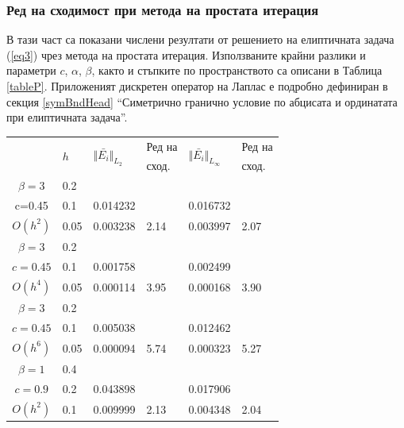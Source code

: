 \documentclass[a4paper]{article}
\newcommand{\rf}[1]{(\ref{#1})}
\theoremstyle{remark}
\begin{document}
\begin{large}
\subsubsection{Ред на сходимост при метода на простата итерация}\label{validation}
В тази част са показани числени резултати от решението на елиптичната задача \rf{eq3} чрез метода на простата итерация. Използваните крайни разлики и параметри $c$, $\alpha$, $\beta$, както и стъпките по пространството са описани в Таблица \ref{tableP}. Приложеният дискретен оператор на Лаплас е подробно дефиниран в секция \ref{symBndHead} ``Симетрично гранично условие по абцисата и ординатата при елиптичната задача''.

\begin{table}[ht]
\centering
		\begin{tabular}{||c|l|ll|ll||}
			\hline
			\hline
      \multirow{2  }{*}{ }        & \multirow{2  }{*}{$h$}  &  	\multirow{2  }{*}{ $\Vert \bar{ E_i} \Vert_{L_2}$ }	&Ред на	& \multirow{2  }{*}{ $\Vert \bar{ E_i} \Vert_{L_\infty}$ } 		&Ред на   \\
	                                        &                                                & 							 					&  сход. 	& 								       					& сход. \\
   					\hline 
					\hline 
$\beta = 3$   	&0.2    										&            &            &           &   \\
      c=0.45 	&0.1    & 0.014232  						&            & 0.016732 			&   \\
   $O(h^2)$     &0.05   & 0.003238  						&2.14  & 0.003997					& 2.07 \\
\hline 
$\beta = 3$   	&0.2   &            &            &             &    \\
      $c=0.45 $ &0.1   &   0.001758   &           &  0.002499  &   \\
       $O(h^4)$	&0.05  &  0.000114 & 3.95    & 0.000168  & 3.90  \\
\hline
$\beta = 3$   	&0.2   &            &        &                  &      \\
   $c=0.45$   	&0.1   &  0.005038 &           & 0.012462       &       \\
     $O(h^6)$	&0.05  &  0.000094  & 5.74  &  0.000323 & 5.27         \\
			\hline
			\hline 	
$\beta = 1$   	&0.4   &             &           &                & \\
     $c=0.9$     &0.2   &  0.043898  &             & 0.017906      &    \\
     $O(h^2)$	&0.1  & 0.009999 & 2.13       & 0.004348      & 2.04  \\

\end{tabular}
\end{table}
\end{large}
\end{document}

